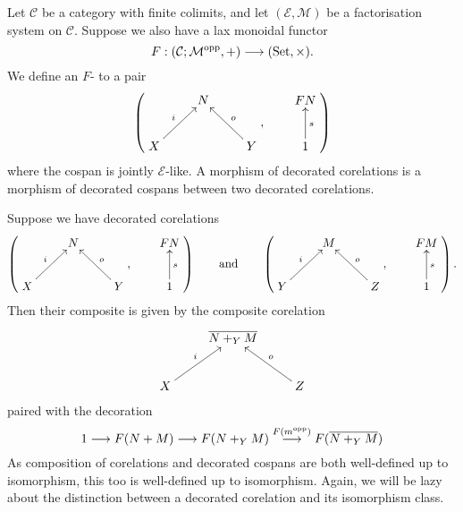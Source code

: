\begin{definition}
  Let $\mathcal C$ be a category with finite colimits, and let $(\mathcal E,
  \mathcal M)$ be a factorisation system on $\mathcal C$. Suppose we also
  have a lax monoidal functor
  \[
    F: (\mathcal C;\mathcal M^{\mathrm{opp}},+) \longrightarrow (\mathrm{Set}, \times).
  \]
  We define an $F$- to a pair
  \[
    \left(
    \begin{aligned}
      \xymatrix{
	& N \\  
	X \ar[ur]^{i} && Y \ar[ul]_{o}
      }
    \end{aligned}
    ,
    \qquad
    \begin{aligned}
      \xymatrix{
	FN \\
	1 \ar[u]_{s}
      }
    \end{aligned}
    \right)
  \]
  where the cospan is jointly $\mathcal E$-like. A morphism of decorated
  corelations is a morphism of decorated cospans between two decorated
  corelations.
\end{definition}

Suppose we have decorated corelations
\[
  \left(
  \begin{aligned}
    \xymatrix{
      & N \\  
      X \ar[ur]^{i} && Y \ar[ul]_{o}
    }
  \end{aligned}
  ,
  \qquad
  \begin{aligned}
    \xymatrix{
      FN \\
      1 \ar[u]_{s}
    }
  \end{aligned}
  \right)
  \qquad
  \mbox{and}
  \qquad
  \left(
  \begin{aligned}
    \xymatrix{
      & M \\  
      Y \ar[ur]^{i} && Z \ar[ul]_{o}
    }
  \end{aligned}
  ,
  \qquad
  \begin{aligned}
    \xymatrix{
      FM \\
      1 \ar[u]_{s}
    }
  \end{aligned}
  \right).
\]
Then their composite is given by the composite corelation
\[
  \xymatrix{
    & \overline{N+_YM} \\  
    X \ar[ur]^{i} && Z \ar[ul]_{o}
  }
\]
paired with the decoration
\[
  1 \longrightarrow F(N+M) \longrightarrow F(N+_YM) \stackrel{F(m^{\mathrm{opp}})}\longrightarrow F(\overline{N+_YM})
\]
As composition of corelations and decorated cospans are both well-defined up to
isomorphism, this too is well-defined up to isomorphism. Again, we will be lazy
about the distinction between a decorated corelation and its isomorphism class.


